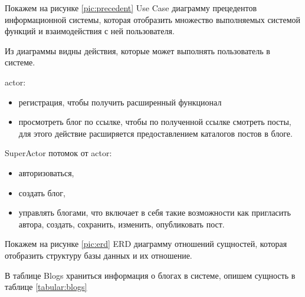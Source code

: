 Покажем на рисунке \ref{pic:precedent} Use Case диаграмму прецедентов информационной системы, которая отобразить множество выполняемых системой функций и взаимодействия с ней пользователя. 
 

Из диаграммы видны действия, которые может выполнять пользователь в системе.

actor:
\begin{itemize}
	\item регистрация, чтобы получить расширенный функционал 
	\item просмотреть блог по ссылке, чтобы по полученной ссылке смотреть посты, для этого действие расширяется предоставлением каталогов постов в блоге.
\end{itemize}

\pagebreak

SuperActor потомок от actor:
\begin{itemize}   
	\item авторизоваться,
	\item создать блог, 
	\item управлять блогами, что включает в себя такие возможности как пригласить автора, создать, сохранить, изменить, опубликовать пост. 
\end{itemize}

Покажем на рисунке \ref{pic:erd} ERD диаграмму отношений сущностей, которая отобразить структуру базы данных и их отношение.


\pagebreak
В таблице Blogs храниться информация о блогах в системе, опишем сущность в таблице \ref{tabular:blogs}

